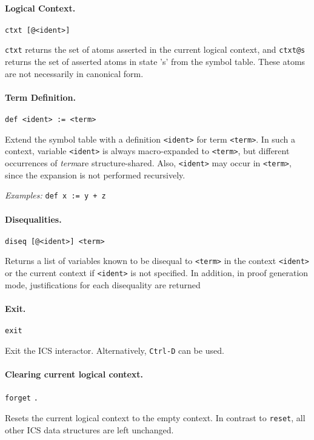 \documentclass[12pt]{article}
\newcommand{\term}{\textit{term}}
\begin{document}
\paragraph{Logical Context.}\label{cmd:ctxt}
  \begin{center}
  \texttt{ctxt [@<ident>]}
  \end{center}
\texttt{ctxt} returns the set of atoms asserted in the current 
 logical context, and \texttt{ctxt@s} returns the set of asserted
 atoms in state 's' from the symbol table. These atoms are not 
 necessarily in canonical form.


\paragraph{Term Definition.}\label{cmd:def}
  \begin{center}
  \texttt{def <ident> := <term>}
  \end{center}
Extend the symbol table with a definition \texttt{<ident>} for term \texttt{<term>}.
In such a context, variable \texttt{<ident>} is always macro-expanded 
to \texttt{<term>}, but different occurrences of \term are structure-shared.
Also, \texttt{<ident>} may occur in \texttt{<term>}, since the expansion
is not performed recursively.

\noindent
{\em Examples:} \texttt{def x := y + z}


\paragraph{Disequalities.}\label{cmd:diseq}
  \begin{center}
  \texttt{diseq [@<ident>]  <term>}
  \end{center}
Returns a list of variables known to be disequal to \texttt{<term>} in
the context \texttt{<ident>} or the current context if \texttt{<ident>} 
is not specified. In addition, in proof generation mode, justifications
for each disequality are returned 

\paragraph{Exit.}\label{cmd:exit}
  \begin{center}
  \texttt{exit}
  \end{center}
Exit the ICS interactor. Alternatively, \texttt{Ctrl-D} can
be used.

\paragraph{Clearing current logical context.}\label{cmd:forget}
  \begin{center}
  \texttt{forget} \texttt{.}
  \end{center}
Resets the current logical context to the empty 
context. In contrast to \texttt{reset}, all other
ICS data structures are left unchanged.
 
\end{document}
